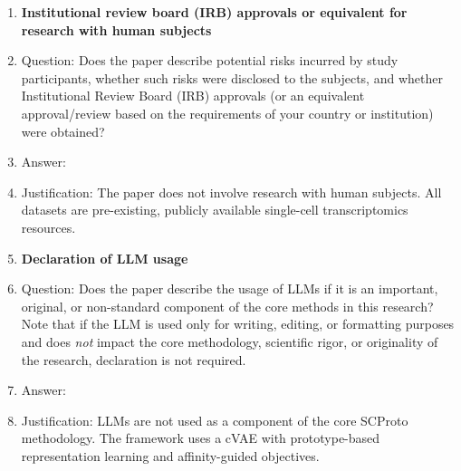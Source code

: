 \begin{enumerate}
\item {\bf Institutional review board (IRB) approvals or equivalent for research with human subjects}
    \item[] Question: Does the paper describe potential risks incurred by study participants, whether such risks were disclosed to the subjects, and whether Institutional Review Board (IRB) approvals (or an equivalent approval/review based on the requirements of your country or institution) were obtained?
    \item[] Answer: \answerNA{}
    \item[] Justification: The paper does not involve research with human subjects. All datasets are pre-existing, publicly available single-cell transcriptomics resources.

\item {\bf Declaration of LLM usage}
    \item[] Question: Does the paper describe the usage of LLMs if it is an important, original, or non-standard component of the core methods in this research? Note that if the LLM is used only for writing, editing, or formatting purposes and does \emph{not} impact the core methodology, scientific rigor, or originality of the research, declaration is not required.
    \item[] Answer: \answerNA{}
    \item[] Justification: LLMs are not used as a component of the core SCProto methodology. The framework uses a cVAE with prototype-based representation learning and affinity-guided objectives.

\end{enumerate}
